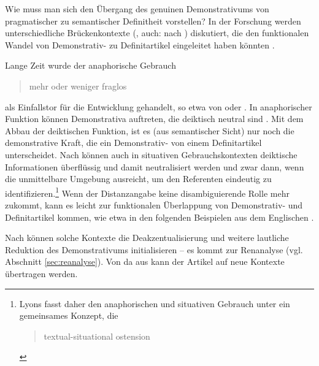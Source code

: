 Wie muss man sich den Übergang des genuinen Demonstrativums von pragmatischer zu semantischer Definitheit vorstellen? In der Forschung werden unterschiedliche Brückenkontexte (\textcite{Heine2002}, auch:  nach \cite{Diewald2002}) diskutiert, die den funktionalen Wandel von Demonstrativ- zu Definitartikel eingeleitet haben könnten \parencite[zur Übersicht s. auch][526--528]{deMulder2011}.

Lange Zeit wurde der anaphorische Gebrauch  \blockcquote[93]{Himmelmann1997}{mehr oder weniger fraglos} als Einfallstor für die Entwicklung gehandelt, so etwa von  \textcite{Oubouzar1989,Oubouzar1992} oder \textcite{Diessel1999}. In anaphorischer Funktion können Demonstrativa auftreten, die deiktisch neutral sind \parencite[41]{Lehmann2015}. Mit dem Abbau der deiktischen Funktion, ist es (aus semantischer Sicht) nur noch die demonstrative Kraft, die ein Demonstrativ- von einem Definitartikel unterscheidet. Nach \textcite[331ff.]{Lyons1999} können auch in situativen Gebrauchskontexten deiktische Informationen überflüssig und damit neutralisiert werden und zwar dann, wenn die unmittelbare Umgebung ausreicht, um den Referenten eindeutig zu identifizieren.\footnote{Lyons fasst daher den anaphorischen und situativen Gebrauch unter ein gemeinsames Konzept, die  \blockcquote[161]{Lyons1999}{textual-situational ostension}.} Wenn der Distanzangabe keine disambiguierende Rolle mehr zukommt, kann es leicht zur funktionalen Überlappung von Demonstrativ- und Definitartikel kommen, wie etwa in den folgenden Beispielen aus dem Englischen \parencite[164]{Lyons1999}. 


 \begin{exe}
	\ex 
	\begin{xlist} \label{ex:lyons}
		\ex \label{ex:lyons-sit}    
		\ex \label{ex:lyons-ana}   
		\end{xlist}
\end{exe}

\noindent
Nach \textcite[332]{Lyons1999} können solche Kontexte die Deakzentualisierung und weitere lautliche Reduktion des Demonstrativums  initialisieren -- es kommt zur Renanalyse (vgl. Abschnitt \ref{sec:reanalyse}). Von da aus kann der Artikel auf neue Kontexte übertragen werden. 

